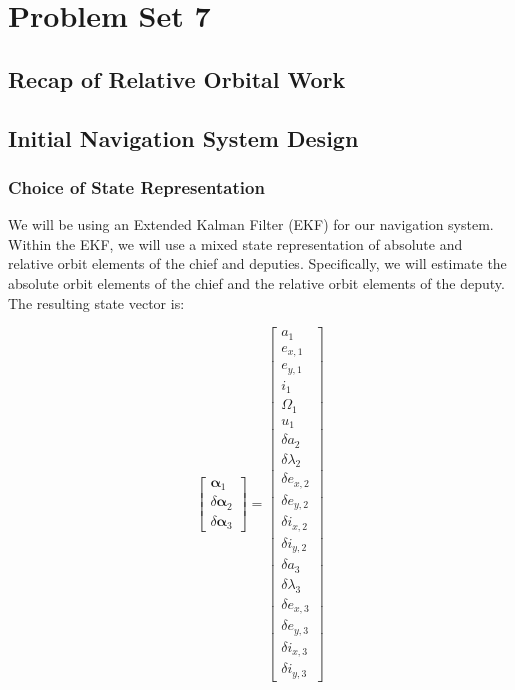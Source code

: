 \section{Problem Set 7}

\subsection{Recap of Relative Orbital Work}

\subsection{Initial Navigation System Design}

\subsubsection{Choice of State Representation}
We will be using an Extended Kalman Filter (EKF) for our navigation system. Within the EKF, we will use a mixed state representation of absolute and relative orbit elements of the chief and deputies. Specifically, we will estimate the absolute orbit elements of the chief and the relative orbit elements of the deputy. The resulting state vector is:

\begin{equation}
\begin{bmatrix}
\boldsymbol{\alpha}_1 \\
\hline
\delta \boldsymbol{\alpha}_2 \\
\hline
\delta \boldsymbol{\alpha}_3
\end{bmatrix}
=
\begin{bmatrix}
a_1 \\
e_{x,1} \\
e_{y,1} \\
i_1 \\
\Omega_1 \\
u_1 \\
\hline
\delta a_2 \\
\delta \lambda_2 \\
\delta e_{x,2} \\
\delta e_{y,2} \\
\delta i_{x,2} \\
\delta i_{y,2} \\
\hline
\delta a_3 \\
\delta \lambda_3 \\
\delta e_{x,3} \\
\delta e_{y,3} \\
\delta i_{x,3} \\
\delta i_{y,3}
\end{bmatrix}
\end{equation}

